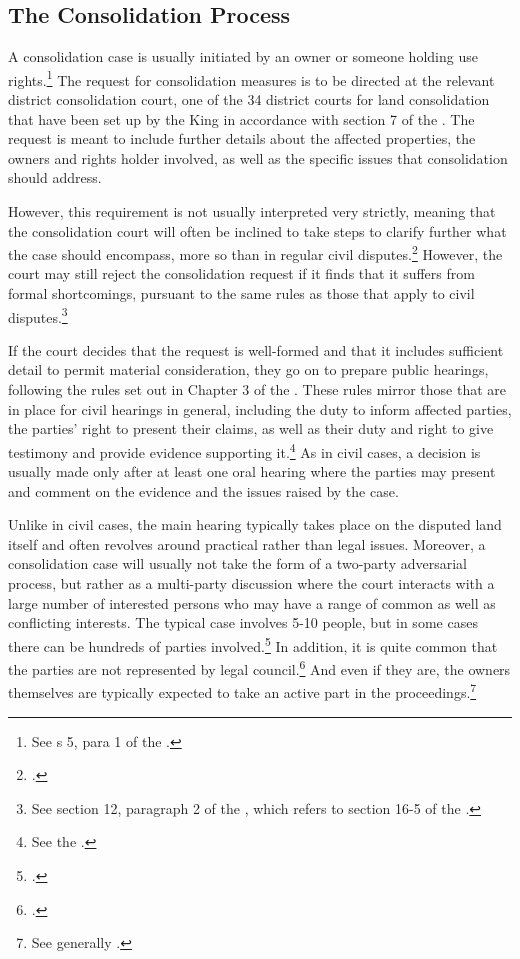 \subsection{The Consolidation Process}\label{subsec:lcp}

A consolidation case is usually initiated by an owner or someone holding use rights.\footnote{See s 5, para 1 of the \cite{lca79}.} The request for consolidation measures is to be directed at the relevant district consolidation court, one of the 34 district courts for land consolidation that have been set up by the King in accordance with section 7 of the \cite{lca79}. The request is meant to include further details about the affected properties, the owners and rights holder involved, as well as the specific issues that consolidation should address.

However, this requirement is not usually interpreted very strictly, meaning that the consolidation court will often be inclined to take steps to clarify further what the case should encompass, more so than in regular civil disputes.\footcite[39]{langbach09} However, the court may still reject the consolidation request if it finds that it suffers from formal shortcomings, pursuant to the same rules as those that apply to civil disputes.\footnote{See section 12, paragraph 2 of the \cite{lca79}, which refers to section 16-5 of the \cite{cda05}.}

If the court decides that the request is well-formed and that it includes sufficient detail to permit material consideration, they go on to prepare public hearings, following the rules set out in Chapter 3 of the \cite{lca79}. These rules mirror those that are in place for civil hearings in general, including the duty to inform affected parties, the parties' right to present their claims, as well as their duty and right to give testimony and provide evidence supporting it.\footnote{See the \cite[13|15|17 a|18]{lca79}.} As in civil cases, a decision is usually made only after at least one oral hearing where the parties may present and comment on the evidence and the issues raised by the case.

Unlike in civil cases, the main hearing typically takes place on the disputed land itself and often revolves around practical rather than legal issues. Moreover, a consolidation case will usually not take the form of a two-party adversarial process, but rather as a multi-party discussion where the court interacts with a large number of interested persons who may have a range of common as well as conflicting interests. The typical case involves 5-10 people, but in some cases there can be hundreds of parties involved.\footcite[39]{langbach09} In addition, it is quite common that the parties are not represented by legal council.\footcite[109-111]{rognes00} And even if they are, the owners themselves are typically expected to take an active part in the proceedings.\footnote{See generally \cite{rognes00}.}

